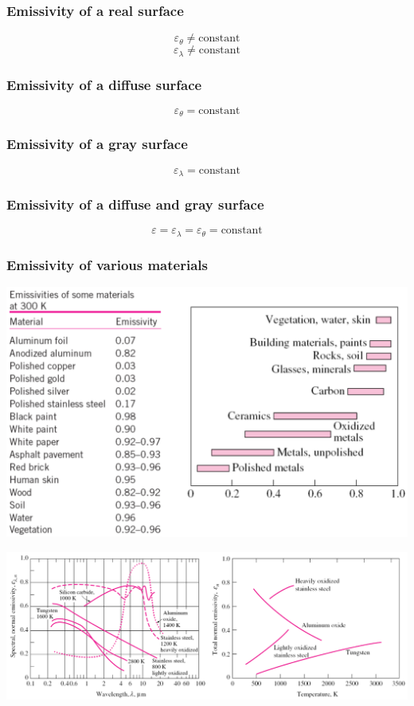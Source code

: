 \documentclass[11pt]{article}
\begin{document}
\subsubsection{Emissivity of a real surface}
\label{sec:orgd260752}
\[\varepsilon_{\theta} \ne \text{constant}\]
\[\varepsilon_{\lambda} \ne \text{constant}\]
\subsubsection{Emissivity of a diffuse surface}
\label{sec:org76dc8e0}
\[\varepsilon_{\theta} = \text{constant}\]
\subsubsection{Emissivity of a gray surface}
\label{sec:orgb44ffa3}
\[\varepsilon_{\lambda} = \text{constant}\]
\subsubsection{Emissivity of a diffuse and gray surface}
\label{sec:org6c7a086}
\[\varepsilon = \varepsilon_{\lambda} = \varepsilon_{\theta} = \text{constant}\]
\subsubsection{Emissivity of various materials}
\label{sec:orge68d237}
\begin{center}
\includegraphics[width=.9\linewidth]{./images/emissivity-of-various-materials-table.png}
\end{center}
\begin{center}
\includegraphics[width=.9\linewidth]{./images/emissivity-of-various-materials-graph.png}
\end{center}
\end{document}
